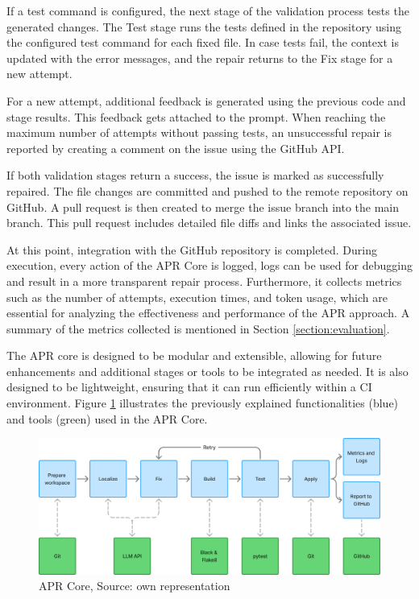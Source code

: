 If a test command is configured, the next stage of the validation process tests the generated changes. The Test stage runs the tests defined in the repository using the configured test command for each fixed file. In case tests fail, the context is updated with the error messages, and the repair returns to the Fix stage for a new attempt.

For a new attempt, additional feedback is generated using the previous code and stage results. This feedback gets attached to the prompt. When reaching the maximum number of attempts without passing tests, an unsuccessful repair is reported by creating a comment on the issue using the GitHub API.

If both validation stages return a success, the issue is marked as successfully repaired. The file changes are committed and pushed to the remote repository on GitHub. A pull request is then created to merge the issue branch into the main branch. This pull request includes detailed file diffs and links the associated issue.

At this point, integration with the GitHub repository is completed. During execution, every action of the APR Core is logged, logs can be used for debugging and result in a more transparent repair process. Furthermore, it collects metrics such as the number of attempts, execution times, and token usage, which are essential for analyzing the effectiveness and performance of the APR approach. A summary of the metrics collected is mentioned in Section \ref{section:evaluation}.

The APR core is designed to be modular and extensible, allowing for future enhancements and additional stages or tools to be integrated as needed. It is also designed to be lightweight, ensuring that it can run efficiently within a CI environment. Figure \ref{fig:apr-core} illustrates the previously explained functionalities (blue) and tools (green) used in the APR Core.

\begin{figure}[H]
    \centering
    \includegraphics[width=1\textwidth]{images/flowcharts/apr_core.png}
    \caption{APR Core, Source: own representation}
    \label{fig:apr-core}
\end{figure}

